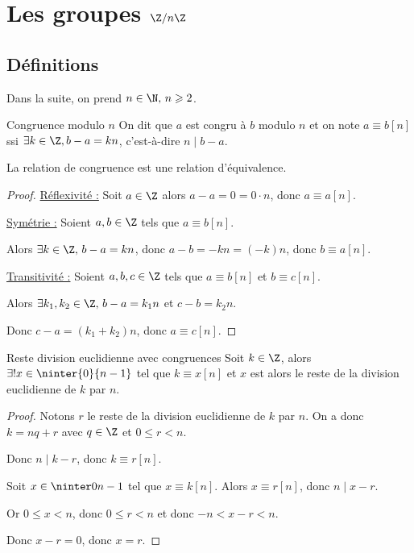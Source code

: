 \section{Les groupes \texorpdfstring{$\Z / n \Z$}{Z/nZ}}
\subsection{Définitions}

Dans la suite, on prend $n \in \N, \, n \geqslant 2$.

\begin{definition}{Congruence modulo $n$}{}
    On dit que $a$ est congru à $b$ modulo $n$ et on note $a \equiv b [n]$ ssi
    $\exists k \in \Z, b - a = kn$, c'est-à-dire $n \mid b - a$.    
\end{definition}

\begin{proposition}{}{}
    La relation de congruence est une relation d'équivalence.
\end{proposition}

\begin{proof}
    \uline{Réflexivité :}
    Soit $a \in \Z$ alors $a - a = 0 = 0 \cdot n$, donc $a \equiv a [n]$.

    \svspace \uline{Symétrie :}
    Soient $a, b \in \Z$ tels que $a \equiv b [n]$.

    Alors $\exists k \in \Z, \, b - a = kn$, donc $a - b = -kn = (-k)n$, donc $b \equiv a [n]$.

    \svspace \uline{Transitivité :} Soient $a, b, c \in \Z$ tels que $a \equiv b [n]$ et $b \equiv c [n]$.

    Alors $\exists k_1, k_2 \in \Z, \, b - a = k_1 n$ et $c - b = k_2 n$.

    Donc $c - a = (k_1 + k_2)n$, donc $a \equiv c [n]$.
\end{proof}

\begin{proposition}{Reste division euclidienne avec congruences}{}
    Soit $k \in \Z$, alors $\exists ! x \in \ninter{0}{n-1}$ tel que $k \equiv x [n]$ 
    et $x$ est alors le reste de la division euclidienne de $k$ par $n$.
\end{proposition}


\begin{proof}
    Notons $r$ le reste de la division euclidienne de $k$ par $n$. 
    On a donc $k = nq + r$ avec $q \in \Z$ et $0 \leqslant r < n$.
    
    Donc $n \mid k - r$, donc $k \equiv r [n]$.

    \avspace Soit $x \in \ninter 0 {n-1}$ tel que $x \equiv k [n]$.
    Alors $x \equiv r [n]$, donc $n \mid x - r$.

    Or $0 \leqslant x < n$, donc $0 \leqslant r < n$
    et donc $-n < x - r < n$.

    Donc $x - r = 0$, donc $x = r$.
\end{proof}

